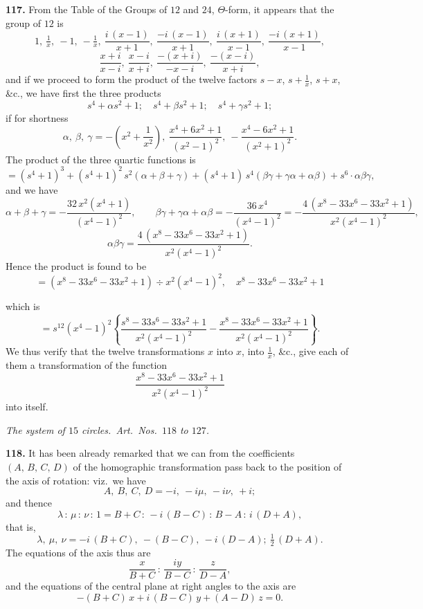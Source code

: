 \documentclass[11pt]{article}
\newcommand{\artno}[1]{\textbf{#1.}\quad}
\begin{document}
\medskip
\noindent
\artno{117} From the Table of the Groups of $12$ and $24$, $\Theta$-form, it
appears that the group of $12$ is
\[
  1,\ \tfrac{1}{x},\ -1,\ -\tfrac{1}{x},\
  \frac{i\,(x - 1)}{x + 1},\ \frac{-i\,(x - 1)}{x + 1},\
  \frac{i\,(x + 1)}{x - 1},\ \frac{-i\,(x + 1)}{x - 1},
\]
\[
  \frac{x + i}{x - i},\ \frac{x - i}{x + i},\
  \frac{-(x + i)}{-x - i},\ \frac{-(x - i)}{x + i},
\]
and if we proceed to form the product of the twelve factors $s - x$,
$s + \tfrac{1}{x}$, $s + x$, \&c., we have first the three products
\[
  s^{4} + \alpha s^{2} + 1;\quad s^{4} + \beta s^{2} + 1;\quad s^{4} + \gamma s^{2} + 1;
\]
if for shortness
\[
  \alpha,\ \beta,\ \gamma = -\left(x^{2} + \frac{1}{x^{2}}\right),\
  \frac{x^{4} + 6 x^{2} + 1}{(x^{2} - 1)^{2}},\
  -\frac{x^{4} - 6 x^{2} + 1}{(x^{2} + 1)^{2}}.
\]
The product of the three quartic functions is
\[
  = (s^{4} + 1)^{3} + (s^{4} + 1)^{2}\,s^{2}(\alpha + \beta + \gamma)
  + (s^{4} + 1)\,s^{4}(\beta\gamma + \gamma\alpha + \alpha\beta)
  + s^{6}\cdot\alpha\beta\gamma,
\]
and we have
\[
  \alpha + \beta + \gamma
  = -\frac{32\,x^{2}(x^{4} + 1)}{(x^{4} - 1)^{2}},\qquad
  \beta\gamma + \gamma\alpha + \alpha\beta
  = -\frac{36\,x^{4}}{(x^{4} - 1)^{2}}
  = -\frac{4\,(x^{8} - 33 x^{6} - 33 x^{2} + 1)}{x^{2}(x^{4} - 1)^{2}},
\]
\[
  \alpha\beta\gamma = \frac{4\,(x^{8} - 33 x^{6} - 33 x^{2} + 1)}{x^{2}(x^{4} - 1)^{2}}.
\]
Hence the product is found to be
\[
  = (x^{8} - 33 x^{6} - 33 x^{2} + 1) \div x^{2}(x^{4} - 1)^{2},\quad
  x^{8} - 33 x^{6} - 33 x^{2} + 1
\]

\bigskip
\noindent
which is
\[
  = s^{12}(x^{4} - 1)^{2}\left\{
  \frac{s^{8} - 33 s^{6} - 33 s^{2} + 1}{x^{2}(x^{4} - 1)^{2}}
  - \frac{x^{8} - 33 x^{6} - 33 x^{2} + 1}{x^{2}(x^{4} - 1)^{2}}
  \right\}.
\]
We thus verify that the twelve transformations $x$ into $x$, into $\tfrac{1}{x}$,
\&c., give each of them a transformation of the function
\[
  \frac{x^{8} - 33 x^{6} - 33 x^{2} + 1}{x^{2}(x^{4} - 1)^{2}}
\]
into itself.

\bigskip
\begin{center}
\textit{The system of $15$ circles.\ Art.\ Nos.\ $118$ to $127$.}
\end{center}

\medskip
\noindent
\artno{118} It has been already remarked that we can from the coefficients
$(A,\, B,\, C,\, D)$ of the homographic transformation pass back to the
position of the axis of rotation: viz.\ we have
\[
  A,\ B,\ C,\ D = -i,\ -i\mu,\ -i\nu,\ +i;
\]
and thence
\[
  \lambda\, :\, \mu\, :\, \nu\, :\, 1
  = B + C\, :\, -i\,(B - C)\, :\, B - A\, :\, i\,(D + A),
\]
that is,
\[
  \lambda,\ \mu,\ \nu = -i\,(B + C),\ -(B - C),\ -i\,(D - A);\ \tfrac{1}{2}\,(D + A).
\]
The equations of the axis thus are
\[
  \frac{x}{B + C}\, :\, \frac{i y}{B - C}\, :\, \frac{z}{D - A},
\]
and the equations of the central plane at right angles to the axis are
\[
  -(B + C)\,x + i\,(B - C)\,y + (A - D)\,z = 0.
\]
\end{document}
